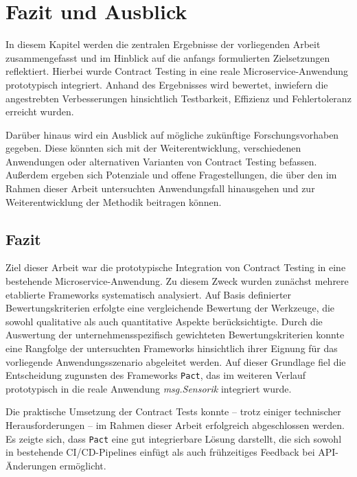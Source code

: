 \chapter{Fazit und Ausblick}\label{ch:summary}

In diesem Kapitel werden die zentralen Ergebnisse der vorliegenden Arbeit zusammengefasst und im Hinblick auf die anfangs formulierten Zielsetzungen reflektiert.
Hierbei wurde Contract Testing in eine reale Microservice-Anwendung prototypisch integriert.
Anhand des Ergebnisses wird bewertet, inwiefern die angestrebten Verbesserungen hinsichtlich Testbarkeit, Effizienz und Fehlertoleranz erreicht wurden.

Darüber hinaus wird ein Ausblick auf mögliche zukünftige Forschungsvorhaben gegeben.
Diese könnten sich mit der Weiterentwicklung, verschiedenen Anwendungen oder alternativen Varianten von Contract Testing befassen.
Außerdem ergeben sich Potenziale und offene Fragestellungen, die über den im Rahmen dieser Arbeit untersuchten Anwendungsfall hinausgehen und zur Weiterentwicklung der Methodik beitragen können.

\section{Fazit}
\label{sec:summary_result}

Ziel dieser Arbeit war die prototypische Integration von Contract Testing in eine bestehende Microservice-Anwendung.
Zu diesem Zweck wurden zunächst mehrere etablierte Frameworks systematisch analysiert.
Auf Basis definierter Bewertungskriterien erfolgte eine vergleichende Bewertung der Werkzeuge, die sowohl qualitative als auch quantitative Aspekte berücksichtigte.
Durch die Auswertung der unternehmensspezifisch gewichteten Bewertungskriterien konnte eine Rangfolge der untersuchten Frameworks hinsichtlich ihrer Eignung für das vorliegende Anwendungsszenario abgeleitet werden.
Auf dieser Grundlage fiel die Entscheidung zugunsten des Frameworks \texttt{Pact}, das im weiteren Verlauf prototypisch in die reale Anwendung \textit{msg.Sensorik} integriert wurde.

Die praktische Umsetzung der Contract Tests konnte – trotz einiger technischer Herausforderungen – im Rahmen dieser Arbeit erfolgreich abgeschlossen werden.
Es zeigte sich, dass \texttt{Pact} eine gut integrierbare Lösung darstellt, die sich sowohl in bestehende \gls{CI}/\gls{CD}-\glspl{Pipeline} einfügt als auch frühzeitiges Feedback bei \gls{API}-Änderungen ermöglicht.

